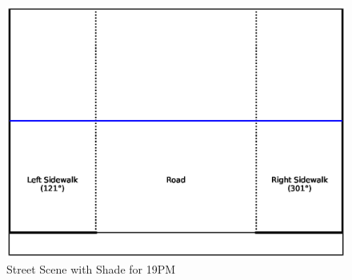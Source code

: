 \documentclass[nohyperref]{article}
\theoremstyle{plain}
\theoremstyle{definition}
\theoremstyle{remark}
\begin{document}
\begin{figure}[ht]
\begin{center}
\centerline{\includegraphics[width=\columnwidth]{sidewalk_predictions/shade_at_19}}
\caption{Street Scene with Shade for 19PM}
\end{center}
\end{figure}

\end{document}

